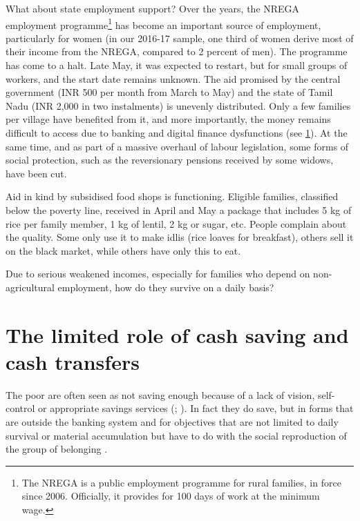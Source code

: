 \documentclass[a4paper, 11pt, onecolumn]{article}
\begin{document}
What about state employment support? Over the years, the NREGA employment programme\footnote{The NREGA is a public employment programme for rural families, in force since 2006. Officially, it provides for 100 days of work at the minimum wage.} has become an important source of employment, particularly for women (in our 2016-17 sample, one third of women derive most of their income from the NREGA, compared to 2 percent of men). 
The programme has come to a halt. 
Late May, it was expected to restart, but for small groups of workers, and the start date remains unknown. 
The aid promised by the central government (INR 500 per month from March to May) and the state of Tamil Nadu (INR 2,000 in two instalments) is unevenly distributed. 
Only a few families per village have benefited from it, and more importantly, the money remains difficult to access due to banking and digital finance dysfunctions (see \ref{section:saving}). 
At the same time, and as part of a massive overhaul of labour legislation, some forms of social protection, such as the reversionary pensions received by some widows, have been cut.

Aid in kind by subsidised food shops is functioning.
Eligible families, classified below the poverty line, received in April and May a package that includes 5 kg of rice per family member, 1 kg of lentil, 2 kg or sugar, etc. 
People complain about the quality.
Some only use it to make idlis (rice loaves for breakfast), others sell it on the black market, while others have only this to eat.

Due to serious weakened incomes, especially for families who depend on non-agricultural employment, how do they survive on a daily basis? 














\section{The limited role of cash saving and cash transfers}
\label{section:saving}

The poor are often seen as not saving enough because of a lack of vision, self-control or appropriate savings services (\citealp[pp. 183--204]{Banerjee2011}; \citealp{Karlan2014}).
In fact they do save, but in forms that are outside the banking system \citep{Collins2009, Rutherford2000, Peebles2014, Peebles2020, Goedecke2017, Guerin2019} and for objectives that are not limited to daily survival or material accumulation but have to do with the social reproduction of the group of belonging \citep{Peebles2014, Douglas1980}.
\end{document}
